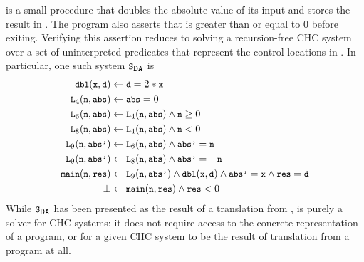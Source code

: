 \begin{figure}[t]
  \centering
  \begin{floatrow}[2]
    {  }
      {}
  \end{floatrow}
\end{figure}
%
 is a small procedure that doubles the absolute value of
its input and stores the result in .
The program also asserts that  is greater than or equal to $0$
before exiting.
Verifying this assertion reduces to solving a recursion-free
CHC system over a set of uninterpreted predicates that represent
the control locations in .
%
In particular, one such system $\mcchc$ is
%
\begin{align}
\label{chc}
\cc{dbl}(\cc{x}, \cc{d}) &\gets \cc{d} = 2 * \cc{x} \\
  \cc{L}_4(\cc{n}, \cc{abs}) &\gets  \cc{abs} = 0 \\
  \cc{L}_6(\cc{n}, \cc{abs}) &\gets \cc{L}_4(\cc{n}, \cc{abs}) \land \cc{n} \ge 0 \\
  \cc{L}_8(\cc{n}, \cc{abs}) &\gets \cc{L}_4(\cc{n}, \cc{abs}) \land \cc{n} < 0 \\
  \cc{L}_9(\cc{n}, \cc{abs'}) &\gets \cc{L}_6(\cc{n},\cc{abs}) \land \cc{abs'} = \cc{n} \\
   \cc{L}_9(\cc{n}, \cc{abs'}) &\gets \cc{L}_8(\cc{n},\cc{abs}) \land \cc{abs'} = -\cc{n} \\
   \cc{main}(\cc{n},\cc{res}) &\gets \cc{L}_9(\cc{n}, \cc{abs'}) \land
                                     \cc{dbl}(\cc{x}, \cc{d})
    \land \cc{abs'} = \cc{x} \land \cc{res} = \cc{d} \\
    \bot &\gets \cc{main}(\cc{n}, \cc{res}) \land \cc{res} < 0 
\end{align}
%
While $\mcchc$ has been presented as the result
of a translation from , \sys is
purely a solver for CHC systems: it does not require access to the
concrete representation of a program, or for a given CHC system to be
the result of translation from a program at all.

